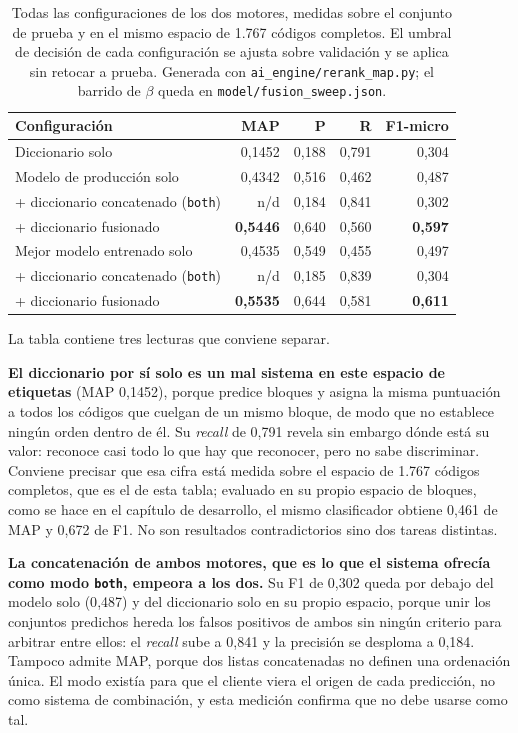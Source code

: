 \begin{table}[h]
\centering
\small
\caption{Todas las configuraciones de los dos motores, medidas sobre el conjunto de prueba y en el mismo espacio de 1.767 códigos completos. El umbral de decisión de cada configuración se ajusta sobre validación y se aplica sin retocar a prueba. Generada con \texttt{ai\_engine/rerank\_map.py}; el barrido de $\beta$ queda en \texttt{model/fusion\_sweep.json}.}
\label{tab:map-fusion}
\begin{tabular}{lrrrr}
\hline
\textbf{Configuración} & \textbf{MAP} & \textbf{P} & \textbf{R} & \textbf{F1-micro} \\
\hline
Diccionario solo & 0{,}1452 & 0{,}188 & 0{,}791 & 0{,}304 \\
\hline
Modelo de producción solo & 0{,}4342 & 0{,}516 & 0{,}462 & 0{,}487 \\
\quad + diccionario concatenado (\texttt{both}) & n/d & 0{,}184 & 0{,}841 & 0{,}302 \\
\quad + diccionario fusionado & \textbf{0{,}5446} & 0{,}640 & 0{,}560 & \textbf{0{,}597} \\
\hline
Mejor modelo entrenado solo & 0{,}4535 & 0{,}549 & 0{,}455 & 0{,}497 \\
\quad + diccionario concatenado (\texttt{both}) & n/d & 0{,}185 & 0{,}839 & 0{,}304 \\
\quad + diccionario fusionado & \textbf{0{,}5535} & 0{,}644 & 0{,}581 & \textbf{0{,}611} \\
\hline
\end{tabular}
\end{table}

La tabla contiene tres lecturas que conviene separar.

\textbf{El diccionario por sí solo es un mal sistema en este espacio de etiquetas} (MAP 0{,}1452), porque predice bloques y asigna la misma puntuación a todos los códigos que cuelgan de un mismo bloque, de modo que no establece ningún orden dentro de él. Su \emph{recall} de 0{,}791 revela sin embargo dónde está su valor: reconoce casi todo lo que hay que reconocer, pero no sabe discriminar. Conviene precisar que esa cifra está medida sobre el espacio de 1.767 códigos completos, que es el de esta tabla; evaluado en su propio espacio de bloques, como se hace en el capítulo de desarrollo, el mismo clasificador obtiene 0{,}461 de MAP y 0{,}672 de F1. No son resultados contradictorios sino dos tareas distintas.

\textbf{La concatenación de ambos motores, que es lo que el sistema ofrecía como modo \texttt{both}, empeora a los dos.} Su F1 de 0{,}302 queda por debajo del modelo solo (0{,}487) y del diccionario solo en su propio espacio, porque unir los conjuntos predichos hereda los falsos positivos de ambos sin ningún criterio para arbitrar entre ellos: el \emph{recall} sube a 0{,}841 y la precisión se desploma a 0{,}184. Tampoco admite MAP, porque dos listas concatenadas no definen una ordenación única. El modo existía para que el cliente viera el origen de cada predicción, no como sistema de combinación, y esta medición confirma que no debe usarse como tal.

